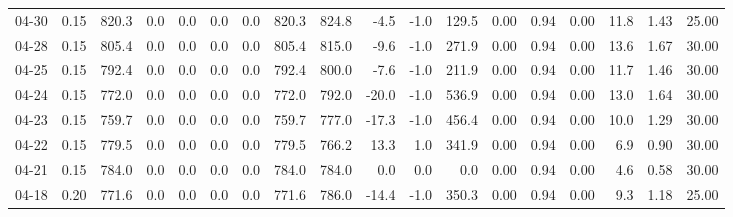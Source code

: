 \begin{threeparttable}
{\begin{tabular}{lrrrrrrrrrrrrrrrrr}
  04-30 &     0.15 & 820.3 &               0.0 &               0.0 &                0.0 &                0.0 & 820.3 & 824.8 &       -4.5 &                     -1.0 &               129.5 &       0.00 &      0.94 &           0.00 &             11.8 &            1.43 &                  25.00 \\
  04-28 &     0.15 & 805.4 &               0.0 &               0.0 &                0.0 &                0.0 & 805.4 & 815.0 &       -9.6 &                     -1.0 &               271.9 &       0.00 &      0.94 &           0.00 &             13.6 &            1.67 &                  30.00 \\
  04-25 &     0.15 & 792.4 &               0.0 &               0.0 &                0.0 &                0.0 & 792.4 & 800.0 &       -7.6 &                     -1.0 &               211.9 &       0.00 &      0.94 &           0.00 &             11.7 &            1.46 &                  30.00 \\
  04-24 &     0.15 & 772.0 &               0.0 &               0.0 &                0.0 &                0.0 & 772.0 & 792.0 &      -20.0 &                     -1.0 &               536.9 &       0.00 &      0.94 &           0.00 &             13.0 &            1.64 &                  30.00 \\
  04-23 &     0.15 & 759.7 &               0.0 &               0.0 &                0.0 &                0.0 & 759.7 & 777.0 &      -17.3 &                     -1.0 &               456.4 &       0.00 &      0.94 &           0.00 &             10.0 &            1.29 &                  30.00 \\
  04-22 &     0.15 & 779.5 &               0.0 &               0.0 &                0.0 &                0.0 & 779.5 & 766.2 &       13.3 &                      1.0 &               341.9 &       0.00 &      0.94 &           0.00 &              6.9 &            0.90 &                  30.00 \\
  04-21 &     0.15 & 784.0 &               0.0 &               0.0 &                0.0 &                0.0 & 784.0 & 784.0 &        0.0 &                      0.0 &                 0.0 &       0.00 &      0.94 &           0.00 &              4.6 &            0.58 &                  30.00 \\
  04-18 &     0.20 & 771.6 &               0.0 &               0.0 &                0.0 &                0.0 & 771.6 & 786.0 &      -14.4 &                     -1.0 &               350.3 &       0.00 &      0.94 &           0.00 &              9.3 &            1.18 &                  25.00 \\

\end{tabular}}
\end{threeparttable}
